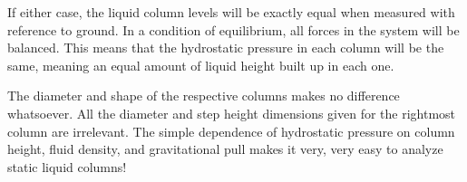 If either case, the liquid column levels will be exactly equal when measured with reference to ground.  In a condition of equilibrium, all forces in the system will be balanced.  This means that the hydrostatic pressure in each column will be the same, meaning an equal amount of liquid height built up in each one.

The diameter and shape of the respective columns makes no difference whatsoever.  All the diameter and step height dimensions given for the rightmost column are irrelevant.  The simple dependence of hydrostatic pressure on column height, fluid density, and gravitational pull makes it very, very easy to analyze static liquid columns!




